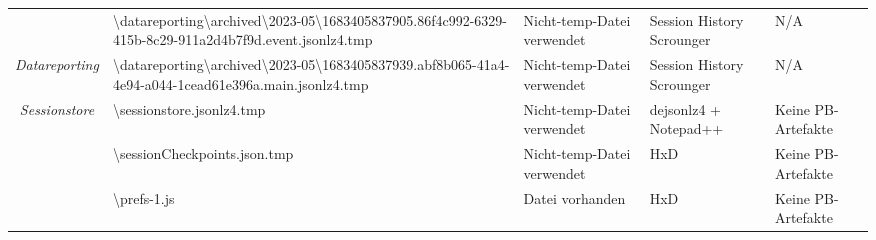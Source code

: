 \begin{appendices}
{\begin{landscape}
\begin{table}[h!]
{\begin{tabular}{cllll}
	\multicolumn{1}{|c|}{}                                                                                       & \multicolumn{1}{l|}{\cellcolor[HTML]{3190FF}\textbackslash{}datareporting\textbackslash{}archived\textbackslash{}2023-05\textbackslash{}1683405837905.86f4c992-6329-415b-8c29-911a2d4b7f9d.event.jsonlz4.tmp}       & \multicolumn{1}{l|}{\cellcolor[HTML]{FCFF2F}Nicht-temp-Datei verwendet}                           & \multicolumn{1}{l|}{Session History Scrounger}   & \multicolumn{1}{l|}{\cellcolor[HTML]{C0C0C0}N/A}                \\ \cline{2-5} 
	\multicolumn{1}{|c|}{\multirow{-4}{*}{\textit{Datareporting}}}                                               & \multicolumn{1}{l|}{\cellcolor[HTML]{3190FF}\textbackslash{}datareporting\textbackslash{}archived\textbackslash{}2023-05\textbackslash{}1683405837939.abf8b065-41a4-4e94-a044-1cead61e396a.main.jsonlz4.tmp}        & \multicolumn{1}{l|}{\cellcolor[HTML]{FCFF2F}Nicht-temp-Datei verwendet}                           & \multicolumn{1}{l|}{Session History Scrounger}   & \multicolumn{1}{l|}{\cellcolor[HTML]{C0C0C0}N/A}                \\ \hline
	\multicolumn{1}{|c|}{\textit{Sessionstore}}                                                                  & \multicolumn{1}{l|}{\cellcolor[HTML]{3190FF}\textbackslash{}sessionstore.jsonlz4.tmp}                                                                                                                               & \multicolumn{1}{l|}{\cellcolor[HTML]{FCFF2F}Nicht-temp-Datei verwendet}                           & \multicolumn{1}{l|}{dejsonlz4 + Notepad++}       & \multicolumn{1}{l|}{\cellcolor[HTML]{F8A102}Keine PB-Artefakte} \\ \hline
	\multicolumn{1}{|c|}{}                                                                                       & \multicolumn{1}{l|}{\cellcolor[HTML]{3190FF}\textbackslash{}sessionCheckpoints.json.tmp}                                                                                                                            & \multicolumn{1}{l|}{\cellcolor[HTML]{FCFF2F}Nicht-temp-Datei verwendet}                           & \multicolumn{1}{l|}{HxD}                         & \multicolumn{1}{l|}{\cellcolor[HTML]{F8A102}Keine PB-Artefakte} \\ \cline{2-5} 
	\multicolumn{1}{|c|}{}                                                                                       & \multicolumn{1}{l|}{\cellcolor[HTML]{3190FF}\textbackslash{}prefs-1.js}                                                                                                                                             & \multicolumn{1}{l|}{\cellcolor[HTML]{009901}Datei vorhanden}                                      & \multicolumn{1}{l|}{HxD}                         & \multicolumn{1}{l|}{\cellcolor[HTML]{F8A102}Keine PB-Artefakte} \\ \cline{2-5} 

\end{tabular}}
\end{table}
\end{landscape}}
\end{appendices}
